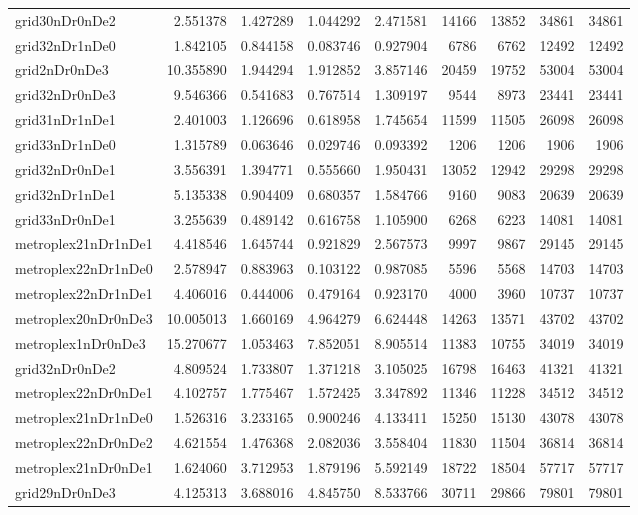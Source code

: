 \begin{longtable}{|l|r|r|r|r|r|r|r|r|}
grid30nDr0nDe2 & 2.551378 & 1.427289 & 1.044292 & 2.471581 & 14166 & 13852 & 34861 & 34861 \\
grid32nDr1nDe0 & 1.842105 & 0.844158 & 0.083746 & 0.927904 & 6786 & 6762 & 12492 & 12492 \\
grid2nDr0nDe3 & 10.355890 & 1.944294 & 1.912852 & 3.857146 & 20459 & 19752 & 53004 & 53004 \\
grid32nDr0nDe3 & 9.546366 & 0.541683 & 0.767514 & 1.309197 & 9544 & 8973 & 23441 & 23441 \\
grid31nDr1nDe1 & 2.401003 & 1.126696 & 0.618958 & 1.745654 & 11599 & 11505 & 26098 & 26098 \\
grid33nDr1nDe0 & 1.315789 & 0.063646 & 0.029746 & 0.093392 & 1206 & 1206 & 1906 & 1906 \\
grid32nDr0nDe1 & 3.556391 & 1.394771 & 0.555660 & 1.950431 & 13052 & 12942 & 29298 & 29298 \\
grid32nDr1nDe1 & 5.135338 & 0.904409 & 0.680357 & 1.584766 & 9160 & 9083 & 20639 & 20639 \\
grid33nDr0nDe1 & 3.255639 & 0.489142 & 0.616758 & 1.105900 & 6268 & 6223 & 14081 & 14081 \\
metroplex21nDr1nDe1 & 4.418546 & 1.645744 & 0.921829 & 2.567573 & 9997 & 9867 & 29145 & 29145 \\
metroplex22nDr1nDe0 & 2.578947 & 0.883963 & 0.103122 & 0.987085 & 5596 & 5568 & 14703 & 14703 \\
metroplex22nDr1nDe1 & 4.406016 & 0.444006 & 0.479164 & 0.923170 & 4000 & 3960 & 10737 & 10737 \\
metroplex20nDr0nDe3 & 10.005013 & 1.660169 & 4.964279 & 6.624448 & 14263 & 13571 & 43702 & 43702 \\
metroplex1nDr0nDe3 & 15.270677 & 1.053463 & 7.852051 & 8.905514 & 11383 & 10755 & 34019 & 34019 \\
grid32nDr0nDe2 & 4.809524 & 1.733807 & 1.371218 & 3.105025 & 16798 & 16463 & 41321 & 41321 \\
metroplex22nDr0nDe1 & 4.102757 & 1.775467 & 1.572425 & 3.347892 & 11346 & 11228 & 34512 & 34512 \\
metroplex21nDr1nDe0 & 1.526316 & 3.233165 & 0.900246 & 4.133411 & 15250 & 15130 & 43078 & 43078 \\
metroplex22nDr0nDe2 & 4.621554 & 1.476368 & 2.082036 & 3.558404 & 11830 & 11504 & 36814 & 36814 \\
metroplex21nDr0nDe1 & 1.624060 & 3.712953 & 1.879196 & 5.592149 & 18722 & 18504 & 57717 & 57717 \\
grid29nDr0nDe3 & 4.125313 & 3.688016 & 4.845750 & 8.533766 & 30711 & 29866 & 79801 & 79801 \\

\end{longtable}
